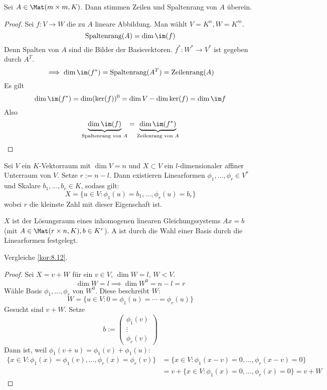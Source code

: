 \documentclass{mycourse}
\begin{document}
\begin{kor}
\label{kor:9.14}
Sei $A\in\Mat(m\times m,K)$.
Dann stimmen Zeilen und Spaltenrang von $A$ überein.
\begin{proof}
Sei $f:V\to W$ die zu $A$ lineare Abbildung.
Man wählt $V=K^n, W=K^m$.
\[
\text{Spaltenrang}(A)=\dim\im(f)
\]
Denn Spalten von $A$ sind die Bilder der Basisvektoren.
$f^*:W^*\to V^*$ ist gegeben durch $A^T$.
\[
\implies \dim \im(f^*)=\text{Spaltenrang}(A^T)=\text{Zeilenrang}(A)
\]
Es gilt
\[
\dim\im(f^*)=\dim(\ker(f))^0=\dim V-\dim\ker(f) = \dim \im f
\]
Also
\[
\underbrace{\dim\im(f)}_{\text{Spaltenrang von $A$}}=\underbrace{\dim\im(f^*)}_{\text{Zeilenrang von $A$}}
\]
\end{proof}
\end{kor}

\begin{thm}
\label{thm:9.15}
Sei $V$ ein $K$-Vektorraum mit $\dim V=n$ und $X\subset V$ ein $l$-dimensionaler affiner Unterraum von $V$.
Setze $r:=n-l$.
Dann existieren Linearformen $\phi_1,\dotsc,\phi_r \in V^*$ und Skalare $b_1,\dotsc,b_r \in K$, sodass gilt:
\[
X=\{u\in V:\phi_1(u)=b_1,\dotsc,\phi_r(u)=b_r\}
\]
wobei $r$ die kleinste Zahl mit dieser Eigenschaft ist.

$X$ ist der Lösungsraum eines inhomogenen linearen Gleichungssystems $Ax=b$ (mit $A \in \Mat(r\times n,K), b\in K^r$).
A ist durch die Wahl einer Basis durch die Linearformen festgelegt.

\begin{note}
Vergleiche \ref{kor:8.12}.
\end{note}

\begin{proof}
Sei $X=v+W$ für ein $v\in V$, $\dim W=l$, $W<V$.
\[
\dim W=l \implies \dim W^0=n-l=r
\]
Wähle Basis $\phi_1,\dotsc,\phi_r$ von $W^0$.
Diese beschreibt $W$:
\[
W=\{u\in V:0=\phi_1(u)=\dotsb=\phi_r(u)\}
\]
Gesucht sind $v+W$.
Setze \[b:=\begin{pmatrix}\phi_1(v)\\\vdots\\\phi_r(v)\end{pmatrix}\]
Dann ist, weil $\phi_1(v+u)=\phi_1(v)+\phi_1(u)$:
\begin{align*}
	\{x\in V: \phi_1(x)=\phi_1(v),\dotsc,\phi_r(x)=\phi_r(v)\}
	&= \{x\in V : \phi_1(x-v)=0,\dotsc,\phi_r(x-v)=0\}\\
	&= v + \{x\in V : \phi_1(x)=0,\dotsc,\phi_r(x)=0\} = v + W
\end{align*}
\end{proof}
\end{thm}
\end{document}
